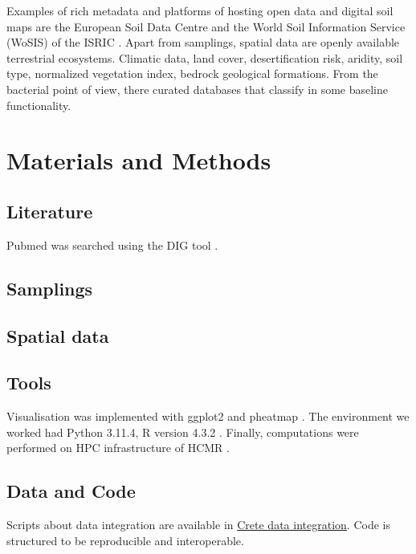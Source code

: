 Examples of rich metadata and platforms of hosting open data and digital soil maps are the 
European Soil Data Centre \parencite{Panagos2022} and the World Soil Information
Service (WoSIS) of the ISRIC \parencite{Batjes2024}. Apart from samplings,
spatial data are openly available terrestrial ecosystems.
Climatic data, land cover, desertification risk, aridity, soil type, normalized
vegetation index, bedrock geological formations. From the bacterial point of view, 
there curated databases that classify in some baseline functionality. 




\section{Materials and Methods}\label{integration_methods}

\subsection{Literature}\label{crete-literature}

Pubmed was searched using the DIG tool \parencite{fanini2021coupling}.

\subsection{Samplings}\label{crete_samplings}

\subsection{Spatial data}\label{crete_spatial}


\subsection{Tools}\label{Coding environment}
Visualisation was implemented with ggplot2 \parencite{wickham_ggplot2_2016} and pheatmap \parencite{Kolde2019}.
The environment we worked had Python 3.11.4, R version 4.3.2 \parencite{rcoreteam}.
Finally, computations were performed on HPC infrastructure of HCMR \parencite{zafeiropoulos_0s_2021}.

\subsection{Data and Code}
Scripts about data integration are available in
\href{https://github.com/savvas-paragkamian/crete-data-integration}{Crete data integration}.
Code is structured to be reproducible and interoperable.

